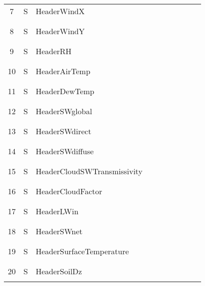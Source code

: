 \begin{longtable}{|c|c|l|c|c|c|c|p{}|c|p{}|}
7 & S & HeaderWindX & & & & & & & \\
&&&&&&&&&\\\hline%
&&&&&&&&&\\
8 & S & HeaderWindY & & & & & & & \\
&&&&&&&&&\\\hline%
&&&&&&&&&\\
9 & S & HeaderRH & & & & & & & \\
&&&&&&&&&\\\hline%
&&&&&&&&&\\
10 & S & HeaderAirTemp & & & & & & & \\
&&&&&&&&&\\\hline%
&&&&&&&&&\\
11 & S & HeaderDewTemp & & & & & & & \\
&&&&&&&&&\\\hline%
&&&&&&&&&\\
12 & S & HeaderSWglobal & & & & & & & \\
&&&&&&&&&\\\hline%
&&&&&&&&&\\
13 & S & HeaderSWdirect & & & & & & & \\
&&&&&&&&&\\\hline%
&&&&&&&&&\\
14 & S & HeaderSWdiffuse & & & & & & & \\
&&&&&&&&&\\\hline%
&&&&&&&&&\\
15 & S & HeaderCloudSWTransmissivity & & & & & & & \\
&&&&&&&&&\\\hline%
&&&&&&&&&\\
16 & S & HeaderCloudFactor & & & & & & & \\
&&&&&&&&&\\\hline%
&&&&&&&&&\\
17 & S & HeaderLWin & & & & & & & \\
&&&&&&&&&\\\hline%
&&&&&&&&&\\
18 & S & HeaderSWnet & & & & & & & \\
&&&&&&&&&\\\hline%
&&&&&&&&&\\
19 & S & HeaderSurfaceTemperature & & & & & & & \\
&&&&&&&&&\\\hline%
&&&&&&&&&\\
20 & S & HeaderSoilDz & & & & & & & \\
&&&&&&&&&\\\hline%

\end{longtable}

